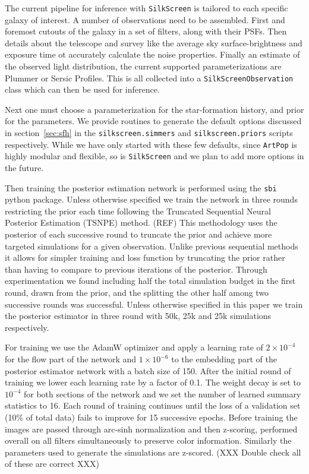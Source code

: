 \documentclass[twocolumn]{aastex631}
\newcommand{\code}[0]{\texttt{SilkScreen}}
\newcommand{\artpop}[0]{\texttt{ArtPop}}
\newcommand{\sbi}[0]{\texttt{sbi}}
\begin{document}
The current pipeline for inference with \code{} is tailored to each specific galaxy of interest. A number of observations need to be assembled. First and foremost cutouts of the galaxy in a set of filters, along with their PSFs. Then details about the telescope and survey like the average sky surface-brightness and exposure time ot accurately calculate the noise properties. Finally an estimate of the observed light distribution, the current supported parameterizations are Plummer or Sersic Profiles. This is all collected into a \texttt{SilkScreenObservation} class which can then be used for inference. 

Next one must choose a parameterization for the star-formation history, and prior for the parameters. We provide routines to generate the default options discussed in section~\ref{sec:sfh} in the \texttt{silkscreen.simmers} and \texttt{silkscreen.priors} scripts respectively. While we have only started with these few defaults, since \artpop{} is highly modular and flexible, so is \code{} and we plan to add more options in the future.

Then training the posterior estimation network is performed using the \sbi{} python package. Unless otherwise specified we train the network in three rounds restricting the prior each time following the Truncated Sequential Neural Posterior Estimation (TSNPE) method. (REF) This methodology uses the posterior of each successive round to truncate the prior and achieve more targeted simulations for a given observation. Unlike previous sequential methods it allows for simpler training and loss function by truncating the prior rather than having to compare to previous iterations of the posterior. Through experimentation we found including half the total simulation budget in the first round, drawn from the prior, and the splitting the other half among two successive rounds was successful. Unless otherwise specified in this paper we train the posterior estimator in three round with 50k, 25k and 25k simulations respectively.

For training we use the AdamW optimizer and apply a learning rate of $2\times 10^{-4}$ for the flow part of the network and $1\times 10^{-6}$ to the embedding part of the posterior estimator network with a batch size of 150. After the initial round of training we lower each learning rate by a factor of 0.1. The weight decay is set to $10^{-4}$ for both sections of the network and we set the number of learned summary statistics to 16. Each round of training continues until the loss of a validation set (10\% of total data) fails to improve for 15 successive epochs. Before training the images are passed through arc-sinh normalization and then z-scoring, performed overall on all filters simultaneously to preserve color information. Similarly the parameters used to generate the simulations are z-scored. (XXX Double check all of these are correct XXX)
\end{document}
